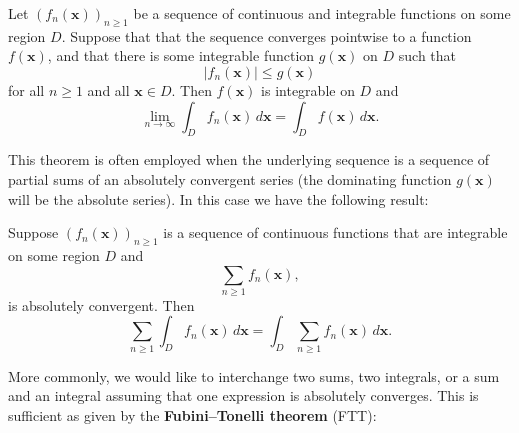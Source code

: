     \begin{theorem*}
      Let $(f_{n}(\mathbf{x}))_{n \ge 1}$ be a sequence of continuous and integrable functions on some region $D$. Suppose that that the sequence converges pointwise to a function $f(\mathbf{x})$, and that there is some integrable function $g(\mathbf{x})$ on $D$ such that
      \[
        |f_{n}(\mathbf{x})| \le g(\mathbf{x})
      \]
      for all $n \ge 1$ and all $\mathbf{x} \in D$. Then $f(\mathbf{x})$ is integrable on $D$ and
      \[
        \lim_{n \to \infty}\int_{D}f_{n}(\mathbf{x})\,d\mathbf{x} = \int_{D}f(\mathbf{x})\,d\mathbf{x}.
      \]
    \end{theorem*}

    This theorem is often employed when the underlying sequence is a sequence of partial sums of an absolutely convergent series (the dominating function $g(\mathbf{x})$ will be the absolute series). In this case we have the following result:

    \begin{corollary}\label{cor:DCT_for_series_and_integrals}
      Suppose $(f_{n}(\mathbf{x}))_{n \ge 1}$ is a sequence of continuous functions that are integrable on some region $D$ and
      \[
        \sum_{n \ge 1}f_{n}(\mathbf{x}),
      \]
      is absolutely convergent. Then
      \[
        \sum_{n \ge 1}\int_{D}f_{n}(\mathbf{x})\,d\mathbf{x} = \int_{D}\sum_{n \ge 1}f_{n}(\mathbf{x})\,d\mathbf{x}.
      \]
    \end{corollary}

    More commonly, we would like to interchange two sums, two integrals, or a sum and an integral assuming that one expression is absolutely converges. This is sufficient as given by the \textbf{Fubini–Tonelli theorem} (FTT):

